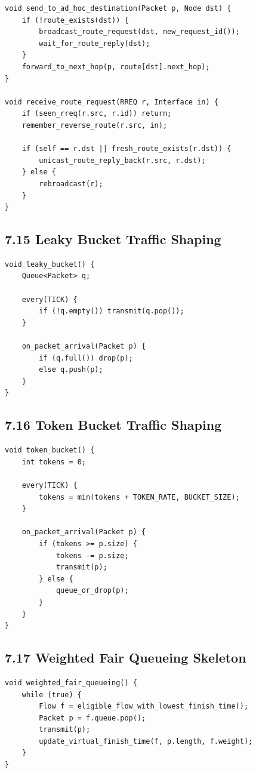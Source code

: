 \documentclass[11pt]{article}
\begin{document}
\begin{verbatim}
void send_to_ad_hoc_destination(Packet p, Node dst) {
    if (!route_exists(dst)) {
        broadcast_route_request(dst, new_request_id());
        wait_for_route_reply(dst);
    }
    forward_to_next_hop(p, route[dst].next_hop);
}

void receive_route_request(RREQ r, Interface in) {
    if (seen_rreq(r.src, r.id)) return;
    remember_reverse_route(r.src, in);

    if (self == r.dst || fresh_route_exists(r.dst)) {
        unicast_route_reply_back(r.src, r.dst);
    } else {
        rebroadcast(r);
    }
}
\end{verbatim}

\subsection{7.15 Leaky Bucket Traffic
Shaping}\label{leaky-bucket-traffic-shaping}

\begin{verbatim}
void leaky_bucket() {
    Queue<Packet> q;

    every(TICK) {
        if (!q.empty()) transmit(q.pop());
    }

    on_packet_arrival(Packet p) {
        if (q.full()) drop(p);
        else q.push(p);
    }
}
\end{verbatim}

\subsection{7.16 Token Bucket Traffic
Shaping}\label{token-bucket-traffic-shaping}

\begin{verbatim}
void token_bucket() {
    int tokens = 0;

    every(TICK) {
        tokens = min(tokens + TOKEN_RATE, BUCKET_SIZE);
    }

    on_packet_arrival(Packet p) {
        if (tokens >= p.size) {
            tokens -= p.size;
            transmit(p);
        } else {
            queue_or_drop(p);
        }
    }
}
\end{verbatim}

\subsection{7.17 Weighted Fair Queueing
Skeleton}\label{weighted-fair-queueing-skeleton}

\begin{verbatim}
void weighted_fair_queueing() {
    while (true) {
        Flow f = eligible_flow_with_lowest_finish_time();
        Packet p = f.queue.pop();
        transmit(p);
        update_virtual_finish_time(f, p.length, f.weight);
    }
}
\end{verbatim}
\end{document}
